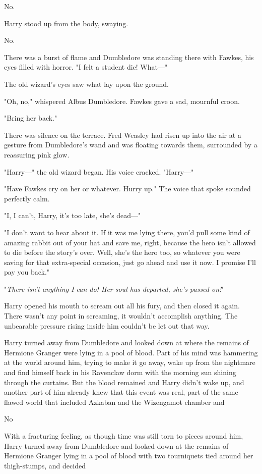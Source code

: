 No.

Harry stood up from the body, swaying.

No.

There was a burst of flame and Dumbledore was standing there with Fawkes, his
eyes filled with horror. "I felt a student die! What---"

The old wizard's eyes saw what lay upon the ground.

"Oh, no," whispered Albus Dumbledore. Fawkes gave a sad, mournful croon.

"Bring her back."

There was silence on the terrace. Fred Weasley had risen up into the air at a
gesture from Dumbledore's wand and was floating towards them, surrounded by a
reassuring pink glow.

"Harry---" the old wizard began. His voice cracked. "Harry---"

"Have Fawkes cry on her or whatever. Hurry up." The voice that spoke sounded
perfectly calm.

"I, I can't, Harry, it's too late, she's dead---"

"I don't want to hear about it. If it was me lying there, you'd pull some kind
of amazing rabbit out of your hat and save me, right, because the hero isn't
allowed to die before the story's over. Well, she's the hero too, so whatever
you were saving for that extra-special occasion, just go ahead and use it now.
I promise I'll pay you back."

"\emph{There isn't anything I can do! Her soul has departed, she's passed on!}"

Harry opened his mouth to scream out all his fury, and then closed it again.
There wasn't any point in screaming, it wouldn't accomplish anything. The
unbearable pressure rising inside him couldn't be let out that way.

Harry turned away from Dumbledore and looked down at where the remains of
Hermione Granger were lying in a pool of blood. Part of his mind was hammering
at the world around him, trying to make it go away, wake up from the nightmare
and find himself back in his Ravenclaw dorm with the morning sun shining
through the curtains. But the blood remained and Harry didn't wake up, and
another part of him already knew that this event was real, part of the same
flawed world that included Azkaban and the Wizengamot chamber and

No

With a fracturing feeling, as though time was still torn to pieces around him,
Harry turned away from Dumbledore and looked down at the remains of Hermione
Granger lying in a pool of blood with two tourniquets tied around her
thigh-stumps, and decided

